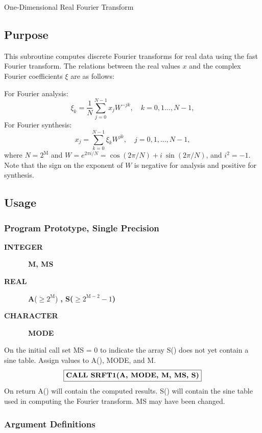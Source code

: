 \documentclass[twoside]{MATH77}
\begin{document}
 One-Dimensional Real Fourier Transform


\subsection{Purpose}

This subroutine computes discrete Fourier transforms for real data using the
fast Fourier transform. The relations between the real values $x$ and the
complex Fourier coefficients $\xi $ are as follows:

For Fourier analysis:
\begin{equation}\label{fa}
\xi _k=\frac 1N\sum_{j=0}^{N-1}x_jW^{-jk},\quad k=0,1...,N-1,
\end{equation}
For Fourier synthesis:
\begin{equation}
\label{fs}x_j=\sum_{k=0}^{N-1}\xi _kW^{jk},\quad j=0,1,...,N-1,
\end{equation}
where $N=2^{\text{M}}$ and $W=e^{2\pi i/N}=\cos (2\pi /N)+i\ \sin (2\pi /N)$, and $%
i^2=-1$. Note that the sign on the exponent of $W$ is negative for analysis
and positive for synthesis.

\subsection{Usage}

\subsubsection{Program Prototype, Single Precision}

\begin{description}
\item[\bf INTEGER]  \ {\bf M, MS}
\item[\bf REAL]  \ {\bf A}($\geq 2^{\text{M}}$)\bf
 {, S}($\geq 2^{\text{M}-2}-1$)
\item[\bf CHARACTER]  \ {\bf MODE}
\end{description}
On the initial call set MS = 0 to indicate the array S() does not yet
contain a sine table. Assign values to A(), MODE, and M.%
$$
\fbox{{\bf CALL SRFT1(A, MODE, M, MS, S)}}
$$
On return A() will contain the computed results. S() will contain the sine
table used in computing the Fourier transform. MS may have been changed.

\subsubsection{Argument Definitions}
\end{document}

